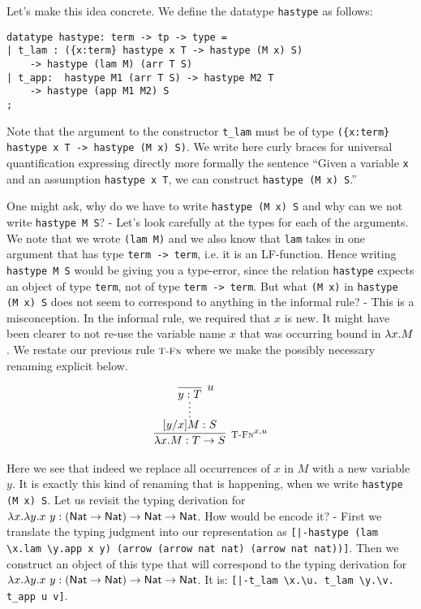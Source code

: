 Let's make this idea concrete. We define the datatype \lstinline!hastype! as
follows:

\begin{lstlisting}
datatype hastype: term -> tp -> type =
| t_lam : ({x:term} hastype x T -> hastype (M x) S)
	-> hastype (lam M) (arr T S)
| t_app:  hastype M1 (arr T S) -> hastype M2 T
	-> hastype (app M1 M2) S
;
\end{lstlisting}

Note that the argument to the constructor \lstinline!t_lam! must be of type
\lstinline!({x:term} hastype x T -> hastype (M x) S)!. We write here curly braces
for universal quantification expressing directly more formally the sentence
``Given a variable \lstinline!x! and an assumption \lstinline!hastype x T!, we can
construct \lstinline!hastype (M x) S!.''

One might ask, why do we have to write \lstinline!hastype (M x) S! and why can
we not write \lstinline!hastype M S!? - Let's look carefully at the types for
each of the arguments. We note that we wrote \lstinline!(lam M)! and we also
know that \lstinline!lam! takes in one argument that has type
\lstinline!term -> term!, i.e. it is an LF-function. Hence writing \lstinline!hastype M S! would be
giving you a type-error, since the relation \lstinline!hastype! expects an
object of type \lstinline!term!, not of type \lstinline!term -> term!.
But what \lstinline!(M x)! in \lstinline!hastype (M x) S! does not seem to
correspond to anything in the informal rule? - This is a misconception. In the
informal rule, we required that $x$ is new. It might have been clearer to not
re-use the variable name $x$ that was occurring bound in $\lambda
x.M$. We restate our previous rule $\textsc{\footnotesize T-Fn}$ where we make the possibly necessary
renaming explicit below.

\[
\begin{array}{c}
\infer[\TFn^{x,u}]{\lam x.M : T \arrow S}
                 {\infer*{[y/x]M:S}{\infer[u]{y:T}{}}}
\end{array}
\]

Here we see that indeed we replace all occurrences of $x$ in $M$ with a new
variable $y$. It is exactly this kind of renaming that is happening, when we
write \lstinline!hastype (M x) S!.
Let us revisit the typing derivation for $\lambda x.\lambda y.x~y : (\textsf{Nat} \rightarrow
\textsf{Nat}) \rightarrow \textsf{Nat} \rightarrow \textsf{Nat}$. How would be encode it? - First we translate the
typing judgment into our representation as
\lstinline![|-hastype (lam \x.lam \y.app x y) (arrow (arrow nat nat) (arrow nat nat))]!.
Then we construct an object of this type that will correspond to the typing
derivation for  $\lambda x.\lambda y.x~y : (\textsf{Nat} \rightarrow
\textsf{Nat}) \rightarrow \textsf{Nat} \rightarrow \textsf{Nat}$.
%
It is: \lstinline![|-t_lam \x.\u. t_lam \y.\v. t_app u v]!.


